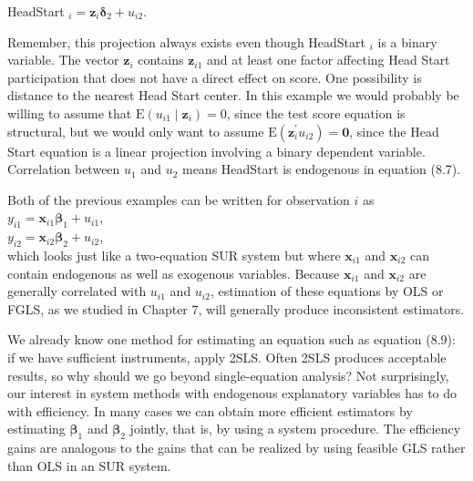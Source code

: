 \documentclass[10pt]{article}
\begin{document}
HeadStart $_{i}=\mathbf{z}_{i} \boldsymbol{\delta}_{2}+u_{i 2}$.

Remember, this projection always exists even though HeadStart ${ }_{i}$ is a binary variable. The vector $\mathbf{z}_{i}$ contains $\mathbf{z}_{i 1}$ and at least one factor affecting Head Start participation that does not have a direct effect on score. One possibility is distance to the nearest Head Start center. In this example we would probably be willing to assume that $\mathrm{E}\left(u_{i 1} \mid \mathbf{z}_{i}\right)=0$, since the test score equation is structural, but we would only want to assume $\mathrm{E}\left(\mathbf{z}_{i}^{\prime} u_{i 2}\right)=\mathbf{0}$, since the Head Start equation is a linear projection involving a binary dependent variable. Correlation between $u_{1}$ and $u_{2}$ means HeadStart is endogenous in equation (8.7).

Both of the previous examples can be written for observation $i$ as\\
$y_{i 1}=\mathbf{x}_{i 1} \boldsymbol{\beta}_{1}+u_{i 1}$,\\
$y_{i 2}=\mathbf{x}_{i 2} \boldsymbol{\beta}_{2}+u_{i 2}$,\\
which looks just like a two-equation SUR system but where $\mathbf{x}_{i 1}$ and $\mathbf{x}_{i 2}$ can contain endogenous as well as exogenous variables. Because $\mathbf{x}_{i 1}$ and $\mathbf{x}_{i 2}$ are generally correlated with $u_{i 1}$ and $u_{i 2}$, estimation of these equations by OLS or FGLS, as we studied in Chapter 7, will generally produce inconsistent estimators.

We already know one method for estimating an equation such as equation (8.9): if we have sufficient instruments, apply 2SLS. Often 2SLS produces acceptable results, so why should we go beyond single-equation analysis? Not surprisingly, our interest in system methods with endogenous explanatory variables has to do with efficiency. In many cases we can obtain more efficient estimators by estimating $\boldsymbol{\beta}_{1}$ and $\boldsymbol{\beta}_{2}$ jointly, that is, by using a system procedure. The efficiency gains are analogous to the gains that can be realized by using feasible GLS rather than OLS in an SUR system.
\end{document}

